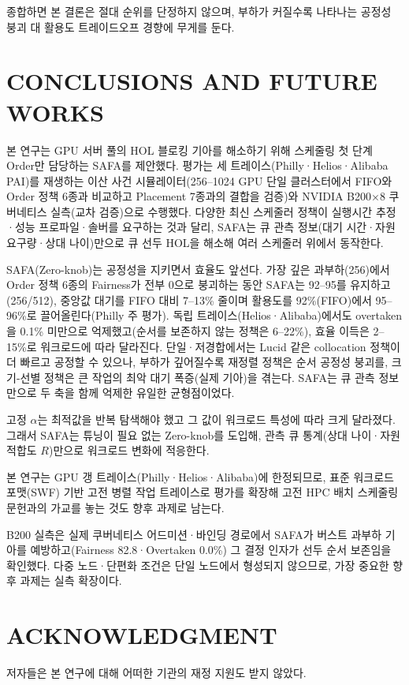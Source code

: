 \documentclass{ieeetj}
\begin{document}
종합하면 본 결론은 절대 순위를 단정하지 않으며, 부하가 커질수록 나타나는 공정성 붕괴 대 활용도 트레이드오프 경향에 무게를 둔다.

\FloatBarrier

\section{CONCLUSIONS AND FUTURE WORKS}\label{conclu}

본 연구는 GPU 서버 풀의 HOL 블로킹 기아를 해소하기 위해 스케줄링 첫 단계 Order만 담당하는 SAFA를 제안했다. 평가는 세 트레이스(Philly·Helios·Alibaba PAI)를 재생하는 이산 사건 시뮬레이터(256--1024 GPU 단일 클러스터에서 FIFO와 Order 정책 6종과 비교하고 Placement 7종과의 결합을 검증)와 NVIDIA B200$\times$8 쿠버네티스 실측(교차 검증)으로 수행했다. 다양한 최신 스케줄러 정책이 실행시간 추정·성능 프로파일·솔버를 요구하는 것과 달리, SAFA는 큐 관측 정보(대기 시간·자원 요구량·상대 나이)만으로 큐 선두 HOL을 해소해 여러 스케줄러 위에서 동작한다.

SAFA(Zero-knob)는 공정성을 지키면서 효율도 앞선다. 가장 깊은 과부하(256)에서 Order 정책 6종의 Fairness가 전부 0으로 붕괴하는 동안 SAFA는 92--95를 유지하고(256/512), 중앙값 대기를 FIFO 대비 7--13\% 줄이며 활용도를 92\%(FIFO)에서 95--96\%로 끌어올린다(Philly 주 평가). 독립 트레이스(Helios·Alibaba)에서도 overtaken을 0.1\% 미만으로 억제했고(순서를 보존하지 않는 정책은 6--22\%), 효율 이득은 2--15\%로 워크로드에 따라 달라진다. 단일·저경합에서는 Lucid 같은 collocation 정책이 더 빠르고 공정할 수 있으나, 부하가 깊어질수록 재정렬 정책은 순서 공정성 붕괴를, 크기-선별 정책은 큰 작업의 최악 대기 폭증(실제 기아)을 겪는다. SAFA는 큐 관측 정보만으로 두 축을 함께 억제한 유일한 균형점이었다.

고정 $\alpha$는 최적값을 반복 탐색해야 했고 그 값이 워크로드 특성에 따라 크게 달라졌다. 그래서 SAFA는 튜닝이 필요 없는 Zero-knob를 도입해, 관측 큐 통계(상대 나이·자원 적합도 $R$)만으로 워크로드 변화에 적응한다.

본 연구는 GPU 갱 트레이스(Philly·Helios·Alibaba)에 한정되므로, 표준 워크로드 포맷(SWF) 기반 고전 병렬 작업 트레이스로 평가를 확장해 고전 HPC 배치 스케줄링 문헌과의 가교를 놓는 것도 향후 과제로 남는다.

B200 실측은 실제 쿠버네티스 어드미션·바인딩 경로에서 SAFA가 버스트 과부하 기아를 예방하고(Fairness 82.8·Overtaken 0.0\%) 그 결정 인자가 선두 순서 보존임을 확인했다. 다중 노드·단편화 조건은 단일 노드에서 형성되지 않으므로, 가장 중요한 향후 과제는 실측 확장이다.

\FloatBarrier
\section*{ACKNOWLEDGMENT}
저자들은 본 연구에 대해 어떠한 기관의 재정 지원도 받지 않았다.
\end{document}
